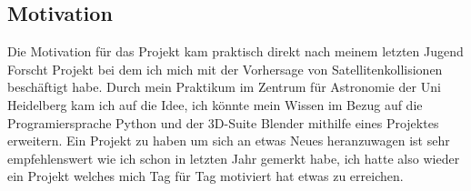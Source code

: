 \subsection{Motivation}

Die Motivation für das Projekt kam praktisch direkt nach meinem letzten Jugend
Forscht Projekt bei dem ich mich mit der Vorhersage von Satellitenkollisionen
beschäftigt habe. Durch mein Praktikum im Zentrum für Astronomie der Uni Heidelberg
kam ich auf die Idee, ich könnte mein Wissen im Bezug auf die Programiersprache
Python und der 3D-Suite Blender mithilfe eines Projektes erweitern.
Ein Projekt zu haben um sich an etwas Neues heranzuwagen ist sehr empfehlenswert
wie ich schon in letzten Jahr gemerkt habe, ich hatte also wieder ein Projekt
welches mich Tag für Tag motiviert hat etwas zu erreichen.
